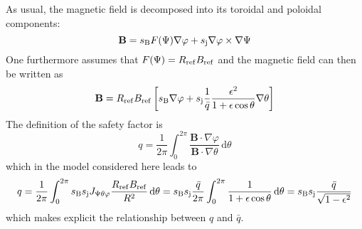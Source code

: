 As usual, the magnetic field is decomposed into its toroidal and poloidal components:
\begin{equation}
 \mathbf{B} = s_{\mathrm{B}}F(\Psi)\nabla \varphi + s_{\mathrm{j}} \nabla \varphi \times \nabla \Psi
\end{equation}
One furthermore assumes that $F(\Psi)=R_{\mathrm{ref}}B_{\mathrm{ref}}$ and the magnetic field can then be written as
\begin{equation}
 \mathbf{B} = R_{\mathrm{ref}}B_{\mathrm{ref}}\left[ s_{\mathrm{B}} \nabla \varphi + s_{\mathrm{j}}\frac{1}{\bar{q}}\frac{\epsilon^2}{1+\epsilon\cos\theta}\nabla \theta\right]
\end{equation}
The definition of the safety factor is
\begin{equation}
 q=\frac{1}{2\pi}\int_0^{2\pi}\frac{\mathbf{B}\cdot\nabla\varphi}{\mathbf{B}\cdot\nabla\theta}\,\textrm{d}\theta
\end{equation}
which in the model considered here leads to
\begin{equation}
 q=\frac{1}{2\pi}\int_0^{2\pi}s_{\mathrm{B}}s_{\mathrm{j}}J_{\Psi\theta\varphi}\frac{R_{\mathrm{ref}}B_{\mathrm{ref}}}{R^2}\,\textrm{d}\theta=s_{\mathrm{B}}s_{\mathrm{j}}\frac{\bar{q}}{2\pi}\int_0^{2\pi}
\frac{1}{1+\epsilon\cos\theta}\,\textrm{d}\theta=s_{\mathrm{B}}s_{\mathrm{j}}\frac{\bar{q}}{\sqrt{1-\epsilon^2}}
\end{equation}
which makes explicit the relationship between $q$ and $\bar{q}$.

